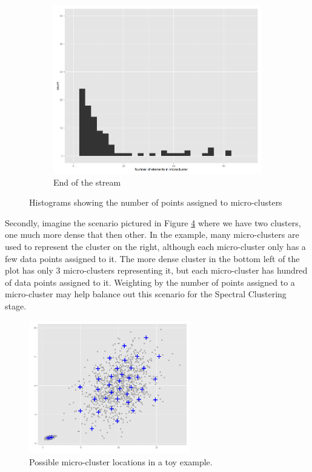 \begin{figure}[h!]
\begin{subfigure}{0.32\textwidth}
  \label{fig:hist2}
  \end{subfigure}
\begin{subfigure}{0.32\textwidth}
    \centering
    \includegraphics[width = \textwidth]{microcluster_histograms/s_set_1_hist_microclusters_time_2000_fixed.png}
  \caption{End of the stream}
  \label{fig:hist3}
  \end{subfigure}
    \caption{Histograms showing the number of points assigned to micro-clusters}
  \label{fig:microHist}
\end{figure}

Secondly, imagine the scenario pictured in Figure \ref{fig:motivate_weighting} where we have two clusters, one much more dense that then other.  In the example, many micro-clusters are used to represent the  cluster on the right, although each micro-cluster only has a few data points assigned to it. The more dense cluster in the bottom left of the plot has only 3 micro-clusters representing it, but each micro-cluster has hundred of data points assigned to it.   Weighting by the number of points assigned to a micro-cluster may help balance out this scenario for the Spectral Clustering stage. 

\begin{figure}[h]
  \centering
  \includegraphics[width = 7cm]{motivate_weighting.png}
  \caption{Possible micro-cluster  locations in a toy example.}
\label{fig:motivate_weighting}
\end{figure}

